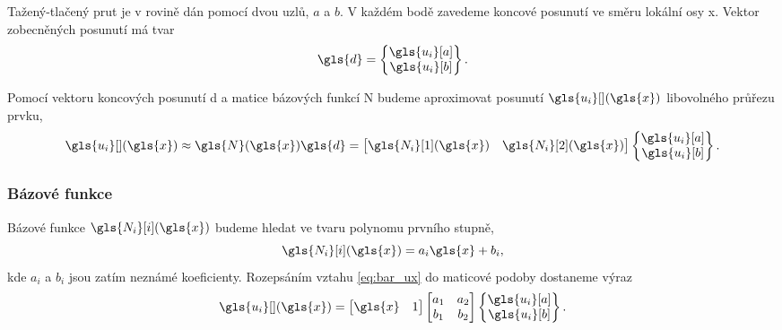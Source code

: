 Tažený-tlačený prut je v rovině dán pomocí dvou uzlů, $a$ a $b$. V každém bodě zavedeme koncové posunutí ve směru lokální osy \gls{x}. Vektor zobecněných posunutí má tvar
\begin{equation}
    \gls{d} = \begin{Bmatrix}
        \gls{u_i}[a] \\
        \gls{u_i}[b]
    \end{Bmatrix}.
\end{equation}

Pomocí vektoru koncových posunutí \gls{d} a matice bázových funkcí \gls{N} budeme aproximovat posunutí $\gls{u_i}[ ](\gls{x})$ libovolného průřezu prvku,
\begin{equation} \label{eq:bar_ux}
    \gls{u_i}[ ](\gls{x}) \approx \gls{N}(\gls{x}) \gls{d}
    = \begin{bmatrix}
        \gls{N_i}[1](\gls{x}) & \gls{N_i}[2](\gls{x})
    \end{bmatrix}
    \begin{Bmatrix}
        \gls{u_i}[a] \\
        \gls{u_i}[b]
    \end{Bmatrix}.
\end{equation}

\subsubsection*{Bázové funkce}

Bázové funkce $\gls{N_i}[i](\gls{x})$ budeme hledat ve tvaru polynomu prvního stupně,
\begin{equation}
    \gls{N_i}[i](\gls{x}) = a_i \gls{x} + b_i,
\end{equation}
kde $a_i$ a $b_i$ jsou zatím neznámé koeficienty. Rozepsáním vztahu \ref{eq:bar_ux} do maticové podoby dostaneme výraz
\begin{equation} \label{eq:bar_ux_matrix}
    \gls{u_i}[ ](\gls{x})
    =
    \begin{bmatrix}
        \gls{x} & 1
    \end{bmatrix}
    \begin{bmatrix}
        a_1 & a_2 \\
        b_1 & b_2
    \end{bmatrix}
    \begin{Bmatrix}
        \gls{u_i}[a] \\
        \gls{u_i}[b]
    \end{Bmatrix}.
\end{equation}


